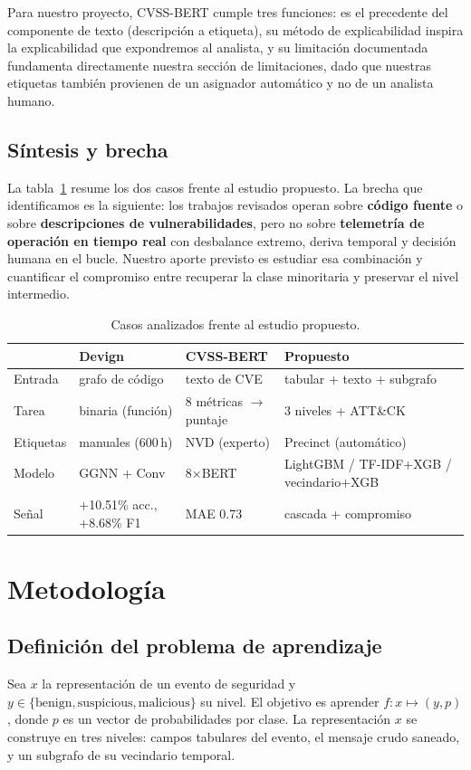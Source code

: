 \documentclass[conference]{IEEEtran}
\begin{document}
Para nuestro proyecto, CVSS-BERT cumple tres funciones: es el precedente del componente de texto (descripci\'on a etiqueta), su m\'etodo de explicabilidad inspira la explicabilidad que expondremos al analista, y su limitaci\'on documentada fundamenta directamente nuestra secci\'on de limitaciones, dado que nuestras etiquetas tambi\'en provienen de un asignador autom\'atico y no de un analista humano.

\subsection{S\'intesis y brecha}
La tabla~\ref{tab:casos} resume los dos casos frente al estudio propuesto. La brecha que identificamos es la siguiente: los trabajos revisados operan sobre \textbf{c\'odigo fuente} o sobre \textbf{descripciones de vulnerabilidades}, pero no sobre \textbf{telemetr\'ia de operaci\'on en tiempo real} con desbalance extremo, deriva temporal y decisi\'on humana en el bucle. Nuestro aporte previsto es estudiar esa combinaci\'on y cuantificar el compromiso entre recuperar la clase minoritaria y preservar el nivel intermedio.

\begin{table}[htbp]
\caption{Casos analizados frente al estudio propuesto.}
\label{tab:casos}
\centering
\begin{tabular}{@{}llll@{}}
\toprule
 & Devign & CVSS-BERT & Propuesto \\
\midrule
Entrada & grafo de c\'odigo & texto de CVE & tabular + texto + subgrafo \\
Tarea & binaria (funci\'on) & 8 m\'etricas $\to$ puntaje & 3 niveles + ATT\&CK \\
Etiquetas & manuales (600\,h) & NVD (experto) & Precinct (autom\'atico) \\
Modelo & GGNN + Conv & 8$\times$BERT & LightGBM / TF-IDF+XGB / vecindario+XGB \\
Se\~nal & +10.51\% acc., +8.68\% F1 & MAE 0.73 & cascada + compromiso \\
\bottomrule
\end{tabular}
\end{table}

\section{Metodolog\'ia}
\label{sec:metodo}

\subsection{Definici\'on del problema de aprendizaje}
Sea $x$ la representaci\'on de un evento de seguridad y $y \in \{\text{benign}, \text{suspicious}, \text{malicious}\}$ su nivel. El objetivo es aprender $f: x \mapsto (y, p)$, donde $p$ es un vector de probabilidades por clase. La representaci\'on $x$ se construye en tres niveles: campos tabulares del evento, el mensaje crudo saneado, y un subgrafo de su vecindario temporal.
\end{document}
